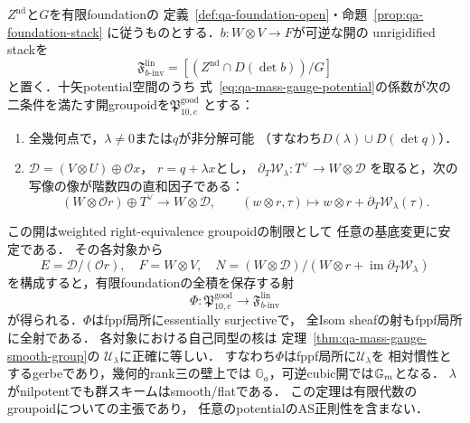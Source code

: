 \begin{theorem}[一積可逆なscheme壁の十矢QP群oid]
\label{thm:qa-ten-arrow-relative-finite-gerbe}
$Z^{\mathrm{nd}}$と$G$を有限foundationの
定義~\ref{def:qa-foundation-open}・命題~\ref{prop:qa-foundation-stack}
に従うものとする．$b:W\otimes V\to F$が可逆な開の
unrigidified stackを
\[
 \mathfrak F^{\mathrm{lin}}_{b\text{-inv}}
   =[(Z^{\mathrm{nd}}\cap D(\det b))/G]
\]
と置く．十矢potential空間のうち
式~\eqref{eq:qa-mass-gauge-potential}の係数が次の
二条件を満たす開groupoidを$\mathfrak P^{\mathrm{good}}_{10,e}$
とする：
\begin{enumerate}
 \item 全幾何点で，$\lambda\ne0$または$q$が非分解可能
       （すなわち$D(\lambda)\cup D(\det q)$）．
 \item $\mathcal D=(V\otimes U)\oplus\mathcal O x$，
       $r=q+\lambda x$とし，
       $\partial_T\mathcal W_\lambda:T^\vee\to W\otimes\mathcal D$
       を取ると，次の写像の像が階数四の直和因子である：
       \[
       (W\otimes\mathcal O r)\oplus T^\vee
          \longrightarrow W\otimes\mathcal D,\qquad
       (w\otimes r,\tau)\longmapsto
             w\otimes r+\partial_T\mathcal W_\lambda(\tau).
       \tag{FR}\label{eq:qa-mass-gauge-relation-bundle}
       \]
\end{enumerate}
この開はweighted right-equivalence groupoidの制限として
任意の基底変更に安定である．
その各対象から
\[
 E=\mathcal D/(\mathcal O r),\quad
 F=W\otimes V,\quad
 N=(W\otimes\mathcal D)/
       (W\otimes r+\operatorname{im}\partial_T\mathcal W_\lambda)
 \tag{FD}\label{eq:qa-mass-gauge-finite-reconstruction}
\]
を構成すると，有限foundationの全積を保存する射
\[
 \Phi:\mathfrak P^{\mathrm{good}}_{10,e}
          \longrightarrow\mathfrak F^{\mathrm{lin}}_{b\text{-inv}}
\]
が得られる．$\Phi$はfppf局所にessentially surjectiveで，
全Isom sheafの射もfppf局所に全射である．
各対象における自己同型の核は
定理~\ref{thm:qa-mass-gauge-smooth-group}の
$\mathcal U_\lambda$に正確に等しい．
すなわち$\Phi$はfppf局所に$\mathcal U_\lambda$を
相対慣性とするgerbeであり，幾何的rank三の壁上では
$\mathbb G_a$，可逆cubic開では$\mathbb G_m$となる．
$\lambda$がnilpotentでも群スキームはsmooth/flatである．
この定理は有限代数のgroupoidについての主張であり，
任意のpotentialのAS正則性を含まない．
\end{theorem}

